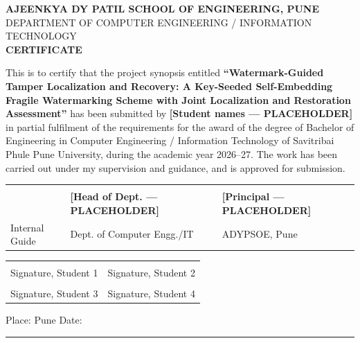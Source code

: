 \documentclass[12pt,a4paper]{article}
\newcommand{\PH}[1]{\textbf{[#1 --- PLACEHOLDER]}}
\begin{document}
\thispagestyle{empty}
\begin{center}
{\large\bfseries AJEENKYA DY PATIL SCHOOL OF ENGINEERING, PUNE}\\[0.06in]
{\large DEPARTMENT OF COMPUTER ENGINEERING / INFORMATION TECHNOLOGY}\\[0.35in]
{\Large\bfseries CERTIFICATE}
\end{center}
\vspace{0.25in}

This is to certify that the project synopsis entitled \textbf{``Watermark-Guided
Tamper Localization and Recovery: A Key-Seeded Self-Embedding Fragile
Watermarking Scheme with Joint Localization and Restoration Assessment''} has
been submitted by \PH{Student names} in partial fulfilment of the requirements
for the award of the degree of Bachelor of Engineering in Computer Engineering /
Information Technology of Savitribai Phule Pune University, during the academic
year 2026--27. The work has been carried out under my supervision and guidance,
and is approved for submission.

\vspace{0.9in}

\noindent
\begin{tabular}{@{}>{\raggedright\arraybackslash}p{2.0in}
                  >{\raggedright\arraybackslash}p{1.9in}
                  >{\raggedright\arraybackslash}p{1.7in}@{}}
\hrulefill & \hrulefill & \hrulefill \\
{\small\PH{Guide}} & {\small\PH{Head of Dept.}} & {\small\PH{Principal}} \\
Internal Guide & Dept. of Computer Engg./IT & ADYPSOE, Pune \\
\end{tabular}

\vspace{0.7in}
\noindent
\begin{tabular}{@{}p{2.6in}p{2.6in}@{}}
\hrulefill & \hrulefill \\
Signature, Student 1 & Signature, Student 2 \\[0.5in]
\hrulefill & \hrulefill \\
Signature, Student 3 & Signature, Student 4 \\
\end{tabular}

\vspace{0.5in}
\noindent Place: Pune \hfill Date: \rule{1.4in}{0.4pt}
\end{document}
